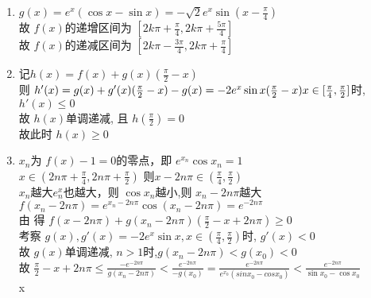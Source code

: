 \documentclass[class=ctexart,crop=false]{standalone}
\begin{document}
\begin{enumerate}[label=(\Roman*)]
    \item $g(x)=e^x({\cos{x}-\sin{x}})=-\sqrt{2}e^x\sin{(x-\frac{\pi}{4})}$\\
    故 $f(x)$的递增区间为 $[2k\pi+\frac{\pi}{4},2k\pi+\frac{5\pi}{4}]$\\
    故 $f(x)$的递减区间为 $[2k\pi-\frac{3\pi}{4},2k\pi+\frac{\pi}{4}]$
    \item 记$h(x)=f(x)+g(x)(\frac{\pi}{2}-x)$\\
    则 $h'(x)=g(x)+g'(x)(\frac{\pi}{2}-x)-g(x)\\
    =-2e^x\sin{x}(\frac{\pi}{2}-x)\\
    x \in [\frac{\pi}{4},\frac{\pi}{2}]$时,$h'(x)\leqslant 0$\\
    故 $h(x)$单调递减,
    且 $h(\frac{\pi}{2})=0$\\
    故此时 $h(x)\geqslant 0$
    \item 
    $x_n$为 $f(x)-1=0$的零点，即 $e^{x_n}\cos{x_n}=1$\\
    $x \in (2n\pi+\frac{\pi}{4},2n\pi+\frac{\pi}{2})$
    则$x-2n\pi \in (\frac{\pi}{4},\frac{\pi}{2})$\\
    $x_n$越大$e^x_n$也越大，则 $\cos{x_n}$越小,则 $x_n-2n\pi$越大\\
    $f(x_n-2n\pi)=e^{x_n-2n\pi}\cos{(x_n-2n\pi)}=e^{-2n\pi}$\\
    由  得 $f(x-2n\pi)+g(x_n-2n\pi)(\frac{\pi}{2}-x+2n\pi)\geqslant 0$\\
    考察 $g(x),g'(x)=-2e^x\sin{x},x\in (\frac{\pi}{4},\frac{\pi}{2})$时, $g'(x)<0$\\
    故 $g(x)$单调递减, $n>1$时,$g(x_n-2n\pi)< g(x_0)<0$\\
    故 $\frac{\pi}{2}-x+2n\pi \leqslant \frac{-e^{-2n\pi}}{g(x_n-2n\pi)}<\frac{e^{-2n\pi}}{-g(x_0)}=\frac{e^{-2n\pi}}{e^{x_0}(sinx_0-cosx_0)}<\frac{e^{-2n\pi}}{\sin{x_0}-\cos{x_0}}$\\
    x
\end{enumerate}
\end{document}
